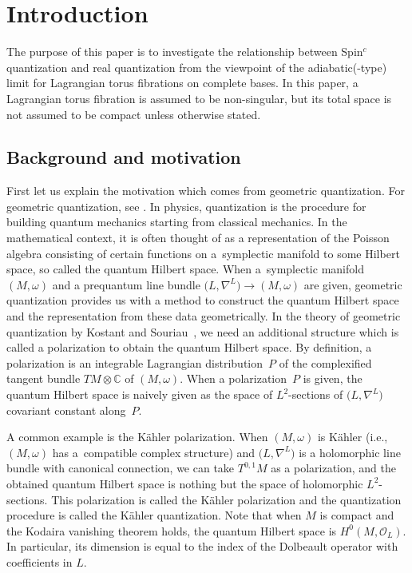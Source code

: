 \documentclass[pdftex]{sigma}
\numberwithin{equation}{section}
\newcommand{\C}{\mathbb{C}}
\newcommand{\CO}{\mathcal O}
\begin{document}

\section{Introduction}
The purpose of this paper is to investigate the relationship between Spin${}^c$ quantization and real quantization from the viewpoint of the adiabatic(-type) limit for Lagrangian torus fibrations on complete bases. In this paper, a Lagrangian torus fibration is assumed to be non-singular, but its total space is not assumed to be compact unless otherwise stated.

\subsection{Background and motivation}
First let us explain the motivation which comes from geometric quantization. For geometric quantization, see \cite{Hall, Ki2,Sn,Woodhouse}. In physics, quantization is the procedure for building quantum mechanics starting from classical mechanics. In the mathematical context, it is often thought of as a representation of the Poisson algebra consisting of certain functions on a~symplectic manifold to some Hilbert space, so called the quantum Hilbert space. When a~symplectic manifold~$(M,\omega)$ and a prequantum line bundle $\bigl(L,\nabla^L\bigr)\to (M,\omega)$ are given, geometric quantization provides us with a method to construct the quantum Hilbert space and the representation from these data
geometrically. In the theory of geometric quantization by Kostant and Souriau~\cite{Kos1,Sou2, Sou1}, we need an additional structure which is called a polarization to obtain the quantum Hilbert space. By definition, a polarization is an integrable Lagrangian distribution~$P$ of the complexified tangent bundle $TM\otimes \C$ of $(M,\omega)$. When a polarization~$P$ is given, the quantum Hilbert space is naively given as the space of $L^2$-sections of $\bigl(L,\nabla^L\bigr)$ covariant constant along~$P$.

A common example is the K\"ahler polarization. When $(M,\omega)$ is K\"ahler (i.e., $(M,\omega)$ has a~compatible complex structure) and $\bigl(L,\nabla^L\bigr)$ is a holomorphic line bundle with canonical connection, we can take $T^{0,1}M$ as a polarization, and the obtained quantum Hilbert space is nothing but the space of holomorphic $L^2$-sections. This polarization is called the K\"ahler polarization and the quantization procedure is called the K\"ahler quantization. Note that when $M$ is compact and the Kodaira vanishing theorem holds, the quantum Hilbert space is $H^0(M,\CO_L)$. In particular, its dimension is equal to the index of the Dolbeault operator with coefficients in $L$.
\end{document}
